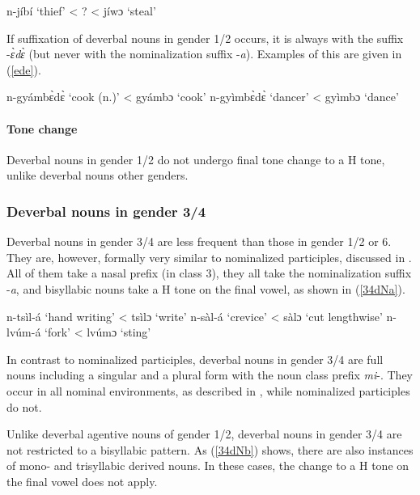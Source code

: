 \begin{exe}
\ex\label{Napp2}
 n-jíbí `thief'  < ? <  jíwɔ `steal'  
\end{exe}


If suffixation of deverbal nouns in gender 1/2 occurs, it is always with the suffix -{\itshape ɛ̀dɛ̀} (but never with the nominalization suffix -{\itshape a}). Examples of this are given in (\ref{ede}).

\begin{exe}
\ex\label{ede} 
\begin{xlist}
\ex n-gyámbɛ̀dɛ̀ `cook (n.)' < gyámbɔ `cook'
\ex n-gyìmbɛ̀dɛ̀ `dancer'     < gyìmbɔ `dance'       
\end{xlist}
\end{exe}

\paragraph{Tone change}  Deverbal nouns in gender 1/2 do not undergo final tone change to a H tone, unlike deverbal nouns other genders. 



\subsubsection{Deverbal nouns in gender 3/4}
\label{sec:NOM34}

Deverbal nouns in gender 3/4 are less frequent than those in gender 1/2 or 6. They are, however, formally very similar to nominalized participles, discussed in . All of them take a nasal prefix (in class 3), they all take the nominalization suffix -{\itshape a}, and bisyllabic nouns take a H tone on the final vowel, as shown in (\ref{34dNa}).

\begin{exe}
\ex\label{34dNa} 
\begin{xlist}
\ex n-tsìl-á `hand writing' < tsìlɔ `write'
\ex n-sàl-á `crevice' < sàlɔ `cut lengthwise'
\ex  n-lvúm-á `fork' <  lvúmɔ `sting'
\end{xlist}
\end{exe}

\noindent In contrast to nominalized participles, deverbal nouns in gender 3/4 are full nouns including a singular and a plural form with the noun class prefix {\itshape mi}-. They occur in all nominal environments, as described in , while nominalized participles do not.

Unlike deverbal agentive nouns of gender 1/2, deverbal nouns in gender 3/4 are not restricted to a bisyllabic pattern. As (\ref{34dNb}) shows, there are also instances of mono- and trisyllabic derived nouns. In these cases, the change to a H tone on the final vowel does not apply. 
 

